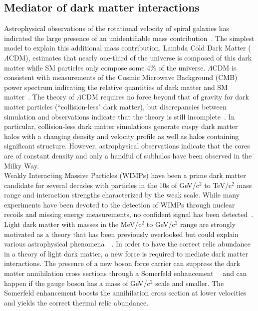 \subsection{Mediator of dark matter interactions}

Astrophysical observations of the rotational velocity of spiral galaxies has indicated the large presence of an unidentifiable mass contribution~\cite{Sofue:2000jx}. The simplest model to explain this additional mass contribution, Lambda Cold Dark Matter ($\Lambda$CDM), estimates that nearly one-third of the universe is composed of this dark matter while SM particles only compose some 4$\%$ of the universe. $\Lambda$CDM is consistent with measurements of the Cosmic Microwave Background (CMB) power spectrum indicating the relative quantities of dark matter and SM matter~\cite{madhavacheril_current_2014}. The theory of $\Lambda$CDM requires no force beyond that of gravity for dark matter particles (``collision-less" dark matter), but discrepancies between simulation and observations indicate that the theory is still incomplete~\cite{weinberg_cold_2013}. In particular, collision-less dark matter simulations generate cuspy dark matter halos with a changing density and velocity profile as well as halos containing significant structure. However, astrophysical observations indicate that the cores are of constant density and only a handful of subhalos have been observed in the Milky Way.  \\
\indent Weakly Interacting Massive Particles (WIMPs) have been a prime dark matter candidate for several decades with particles in the 10s of GeV/c$^2$ to TeV/c$^2$ mass range and interaction strengths characterized by the weak scale. While many experiments have been devoted to the detection of WIMPs through nuclear recoils and missing energy measurements, no confident signal has been detected~\cite{liu_signals_2015}. Light dark matter with masses in the MeV/c$^2$ to GeV/c$^2$ range are strongly motivated as a theory that has been previously overlooked but could explain various astrophysical phenomena~\cite{hooper_dark_2012}~\cite{morrissey_abelian_2009}. In order to have the correct relic abundance in a theory of light dark matter, a new force is required to mediate dark matter interactions. The presence of a new boson force carrier can suppress the dark matter annihilation cross sections through a Somerfeld enhancement~\cite{arkani-hamed_theory_2009}~\cite{finkbeiner_consistent_2011} and can happen if the gauge boson has a mass of GeV/c$^2$ scale and smaller. The Somerfeld enhancement boosts the annihilation cross section at lower velocities and yields the correct thermal relic abundance. \\

